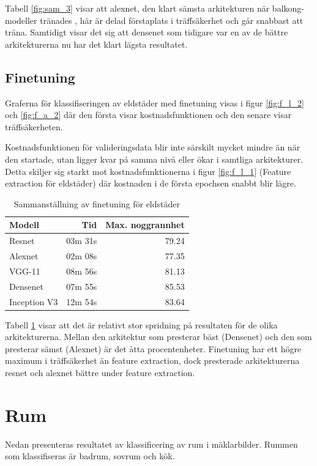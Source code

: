 \documentclass[]{kththesis}
\begin{document}
Tabell \ref{fig:sam_3} visar att alexnet, den klart sämsta arkitekturen när balkong-modeller tränades , här är delad förstaplats i träffsäkerhet och går snabbast att träna.
Samtidigt visar det sig att densenet som tidigare var en av de bättre arkitekturerna nu har det klart lägsta resultatet.

\subsection{Finetuning}
Graferna för klassifiseringen av eldstäder med finetuning visas i figur \ref{fig:f_l_2} och \ref{fig:f_a_2} där den första visar kostnadsfunktionen och den senare visar träffsäkerheten.

Kostnadsfunktionen för valideringsdata blir inte särskilt mycket mindre än när den startade, utan ligger kvar på samma nivå eller ökar i samtliga arkitekturer.
Detta skiljer sig starkt mot kostnadsfunktionerna i figur \ref{fig:f_l_1} (Feature extraction för eldstäder) där kostnaden i de första epochsen snabbt blir lägre. 


\begin{table}[!htbp]
  \centering
  \begin{tabular}{|l|r|r|}
    Modell & Tid & Max. noggrannhet \\ 
    \hline
    Resnet       & 03m 31s & 79.24 \\
    Alexnet      & 02m 08s & 77.35 \\
    VGG-11       & 08m 56s & 81.13 \\
    Densenet     & 07m 55s & 85.53 \\
    Inception V3 & 12m 54s & 83.64 \\
  \end{tabular}
  \caption{Sammanställning av finetuning för eldstäder}
  \label{fig:sam_4}  
\end{table}

Tabell \ref{fig:sam_4} visar att det är relativt stor spridning på resultaten för de olika arkitekturerna.
Mellan den arkitektur som presterar bäst (Densenet) och den som presterar sämst (Alexnet) är det åtta procentenheter.
Finetuning har ett högre maximum i träffsäkerhet än feature extraction, dock presterade arkitekturerna resnet och alexnet bättre under feature extraction.

\section{Rum}
Nedan presenteras resultatet av klassificering av rum i mäklarbilder. 
Rummen som klassifiseras är badrum, sovrum och kök.
\end{document}
